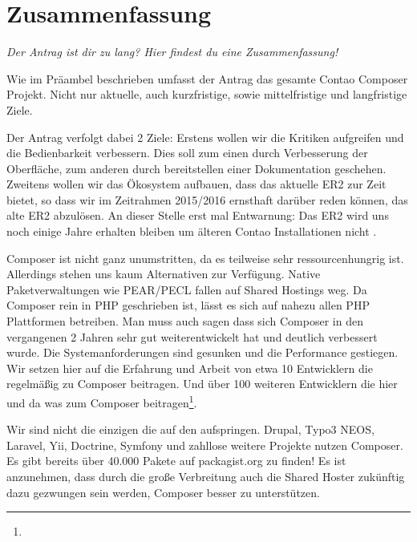 \documentclass[
paper=a4,
draft=false,%
fontsize=10pt%
]{scrartcl}
\begin{document}
\pagebreak
\tableofcontents
\pagebreak

%
%

\section{Zusammenfassung}
\label{sec:summary}

\textit{Der Antrag ist dir zu lang? Hier findest du eine Zusammenfassung!}

Wie im Präambel beschrieben umfasst der Antrag das gesamte Contao Composer Projekt. Nicht nur aktuelle, auch kurzfristige, sowie mittelfristige und langfristige Ziele.

Der Antrag verfolgt dabei 2 Ziele:
Erstens wollen wir die Kritiken aufgreifen und die Bedienbarkeit verbessern. Dies soll zum einen durch Verbesserung der Oberfläche, zum anderen durch bereitstellen einer Dokumentation geschehen.
Zweitens wollen wir das Ökosystem aufbauen, dass das aktuelle ER2 zur Zeit bietet, so dass wir im Zeitrahmen 2015/2016 ernsthaft darüber reden können, das alte ER2 abzulösen. An dieser Stelle erst mal Entwarnung: Das ER2 wird uns noch einige Jahre erhalten bleiben um älteren Contao Installationen nicht .

Composer ist nicht ganz unumstritten, da es teilweise sehr ressourcenhungrig ist. Allerdings stehen uns kaum Alternativen zur Verfügung. Native Paketverwaltungen wie PEAR/PECL fallen auf Shared Hostings weg. Da Composer rein in PHP geschrieben ist, lässt es sich auf nahezu allen PHP Plattformen betreiben. Man muss auch sagen dass sich Composer in den vergangenen 2 Jahren sehr gut weiterentwickelt hat und deutlich verbessert wurde. Die Systemanforderungen sind gesunken und die Performance gestiegen. Wir setzen hier auf die Erfahrung und Arbeit von etwa 10 Entwicklern die regelmäßig zu Composer beitragen. Und über 100 weiteren Entwicklern die hier und da was zum Composer beitragen\footnote{}.

Wir sind nicht die einzigen die auf den  aufspringen. Drupal, Typo3 NEOS, Laravel, Yii, Doctrine, Symfony und zahllose weitere Projekte nutzen Composer. Es gibt bereits über 40.000 Pakete auf packagist.org zu finden! Es ist anzunehmen, dass durch die große Verbreitung auch die Shared Hoster zukünftig dazu gezwungen sein werden, Composer besser zu unterstützen.
\end{document}
